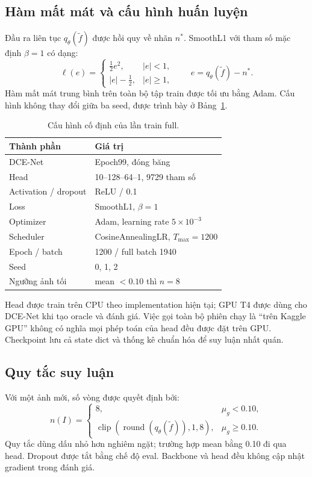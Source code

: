 \subsection{Hàm mất mát và cấu hình huấn luyện}
Đầu ra liên tục $q_\theta(\widetilde f)$ được hồi quy về nhãn $n^*$. SmoothL1 với tham số mặc định $\beta=1$ có dạng:
\begin{equation}
\ell(e)=\begin{cases}\tfrac12 e^2,&|e|<1,\\|e|-\tfrac12,&|e|\ge1,\end{cases}\qquad e=q_\theta(\widetilde f)-n^*.
\end{equation}
Hàm mất mát trung bình trên toàn bộ tập train được tối ưu bằng Adam. Cấu hình không thay đổi giữa ba seed, được trình bày ở Bảng~\ref{tab:config}.
\begin{table}[H]\centering\caption{Cấu hình cố định của lần train full.}\label{tab:config}
\begin{tabular}{ll}\toprule
Thành phần & Giá trị\\\midrule
DCE-Net & Epoch99, đóng băng\\
Head & 10--128--64--1, 9729 tham số\\
Activation / dropout & ReLU / 0.1\\
Loss & SmoothL1, $\beta=1$\\
Optimizer & Adam, learning rate $5\times10^{-3}$\\
Scheduler & CosineAnnealingLR, $T_{\max}=1200$\\
Epoch / batch & 1200 / full batch 1940\\
Seed & 0, 1, 2\\
Ngưỡng ảnh tối & mean $<0.10$ thì $n=8$\\\bottomrule
\end{tabular}
\end{table}
Head được train trên CPU theo implementation hiện tại; GPU T4 được dùng cho DCE-Net khi tạo oracle và đánh giá. Việc gọi toàn bộ phiên chạy là ``trên Kaggle GPU'' không có nghĩa mọi phép toán của head đều được đặt trên GPU. Checkpoint lưu cả state dict và thống kê chuẩn hóa để suy luận nhất quán.

\subsection{Quy tắc suy luận}
Với một ảnh mới, số vòng được quyết định bởi:
\begin{equation}
n(I)=\begin{cases}
8,&\mu_g<0.10,\\
\operatorname{clip}(\operatorname{round}(q_\theta(\widetilde f)),1,8),&\mu_g\ge0.10.
\end{cases}
\end{equation}
Quy tắc dùng dấu nhỏ hơn nghiêm ngặt; trường hợp mean bằng 0.10 đi qua head. Dropout được tắt bằng chế độ eval. Backbone và head đều không cập nhật gradient trong đánh giá.

